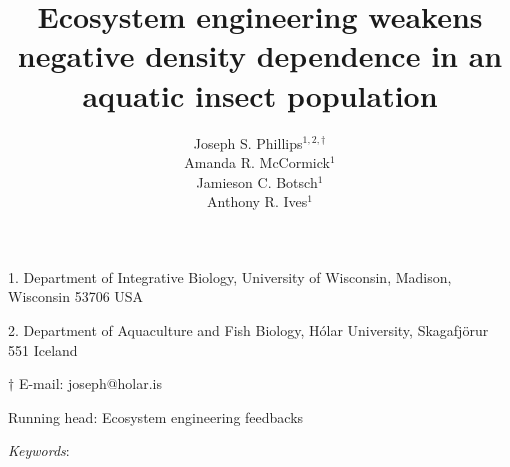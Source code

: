 \documentclass[12pt]{article}
\title{Ecosystem engineering weakens negative density dependence in an aquatic insect population}
\author{
Joseph S. Phillips$^{1,2,\dagger}$ \\
Amanda R. McCormick$^{1}$ \\
Jamieson C. Botsch$^{1}$ \\
Anthony R. Ives$^{1}$}
\date{}
\begin{document}
\raggedright
\setlength\parindent{0.25in}

\maketitle

\noindent{} 1. Department of Integrative Biology, University of Wisconsin, Madison, Wisconsin 53706 USA

\noindent{} 2. Department of Aquaculture and Fish Biology, H\'{o}lar University, Skagafj\"{o}r{\dh}ur 551 Iceland

\noindent{} $\dagger$ E-mail: joseph@holar.is

\bigskip

Running head: {Ecosystem engineering feedbacks}

\linenumbers{}

\clearpage








\bigskip

\textit{Keywords}: {}

\clearpage











\end{document}
